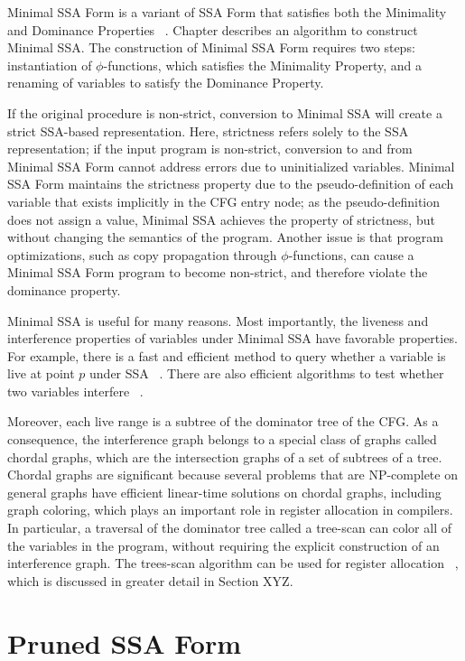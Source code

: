 Minimal SSA Form is a variant of SSA Form that satisfies both the 
Minimality and Dominance Properties ~\cite{CytronOct91}. Chapter
\label{chap:classical_construction} describes an algorithm to
construct Minimal SSA. The construction of Minimal SSA Form
requires two steps: instantiation of $\phi$-functions, which
satisfies the Minimality Property, and a renaming of variables
to satisfy the Dominance Property. 

If the original procedure is non-strict, conversion to Minimal SSA
will create a strict SSA-based representation. Here, strictness refers
solely to the SSA representation; if the input program is non-strict,
conversion to and from Minimal SSA Form cannot address errors due
to uninitialized variables. Minimal SSA Form maintains the strictness
property due to the pseudo-definition of each variable that exists
implicitly in the CFG entry node; as the pseudo-definition does not
assign a value, Minimal SSA achieves the property of strictness, but
without changing the semantics of the program. Another issue is
that program optimizations, such as copy propagation through
$\phi$-functions, can cause a Minimal SSA Form program to
become non-strict, and therefore violate the dominance property.

Minimal SSA is useful for many reasons. Most importantly, the liveness
and interference properties of variables under Minimal SSA have favorable
properties. For example, there is a fast and efficient method to query whether
a variable is live at point $p$ under SSA ~\cite{BoissinotApr08}. 
There are also efficient algorithms to test whether two variables interfere
~\cite{BudimlicJun02, BoissinotApr09}. 

Moreover, each live range is a subtree of the dominator tree of the CFG. 
As a consequence, the interference graph belongs to a special class of
graphs called chordal graphs, which are the intersection graphs of a set
of subtrees of a tree. Chordal graphs are significant because several
problems that are NP-complete on general graphs have efficient linear-time
solutions on chordal graphs, including graph coloring, which plays
an important role in register allocation in compilers. In particular,
a traversal of the dominator tree called a tree-scan can color all of
the variables in the program, without requiring the explicit construction
of an interference graph. The trees-scan algorithm can be used
for register allocation ~\cite{ColumbetOct11}, which is discussed
in greater detail in Section XYZ. 


\section{Pruned SSA Form}
\label{sec-prop-pruned}

